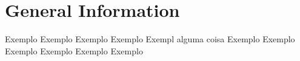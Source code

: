 \section{General Information}

Exemplo Exemplo Exemplo Exemplo\cite{boulic:91} Exempl alguma coisa Exemplo Exemplo Exemplo Exemplo Exemplo Exemplo 